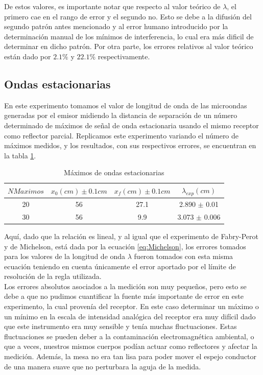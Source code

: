 \documentclass[%
 reprint,
 amsmath,amssymb,
 aps,
]{revtex4-1}
\begin{document}
De estos valores, es importante notar que respecto al valor teórico de $\lambda$, el primero cae en el rango de error y el segundo no. Esto se debe a la difusión del segundo patrón antes mencionado y al error humano introducido por la determinación manual de los mínimos de interferencia, lo cual era más dificil de determinar en dicho patrón. Por otra parte, los errores relativos al valor teórico están dado por $2.1\%$ y $22.1\%$ respectivamente.\\

\subsection{\label{sec:level2}Ondas estacionarias}
En este experimento tomamos el valor de longitud de onda de las microondas generadas por el emisor midiendo la distancia de separación de un número determinado de máximos de señal de onda estacionaria usando el mismo receptor como reflector parcial. Replicamos este experimento variando el número de máximos medidos, y los resultados, con sus respectivos errores, se encuentran en la tabla \ref{table:estacionaria}.\\

\begin{table}[h!]
\centering
 \begin{tabular}{|c|c|c|c|} 
 \hline
 $N Maximos$& $x_0(cm) \pm 0.1cm$ & $x_f(cm) \pm 0.1cm$ & $\lambda_{exp} (cm)$ \\ [0.5ex] 
 \hline\hline
 20 & 56 & 27.1 & 2.890 $\pm$ 0.01\\
 30 & 56 & 9.9 & 3.073 $\pm$ 0.006\\
[1ex] 
 \hline
 \end{tabular}
 \caption{Máximos de ondas estacionarias}
 \label{table:estacionaria}
\end{table}

Aquí, dado que la relación es lineal, y al igual que el experimento de Fabry-Perot y de Michelson, está dada por la ecuación \ref{eq:Michelson}, los errores tomados para los valores de la longitud de onda $\lambda$ fueron tomados con esta misma ecuación teniendo en cuenta únicamente el error aportado por el límite de resolución de la regla utilizada.\\

Los errores absolutos asociados a la medición son muy  pequeños, pero esto se debe a que no pudimos cuantificar la fuente más importante de error en este experimento, la cual provenía del receptor. En este caso determinar un máximo o un mínimo en la escala de intensidad analógica del receptor era muy difícil dado que este instrumento era muy sensible y tenía muchas fluctuaciones. Estas fluctuaciones se pueden deber a la contaminación electromagnética ambiental, o que a veces, nuestros mismos cuerpos podían actuar como reflectores y afectar la medición. Además, la mesa no era tan lisa para poder mover el espejo conductor de una manera suave que no perturbara la aguja de la medida.\\
\end{document}
